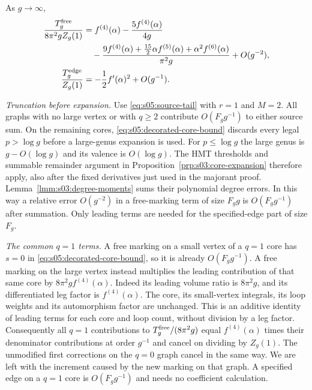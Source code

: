 \begin{lmm}\label{lmm:s05:single-source}
As $g\to\infty$,
\begin{align}
 \frac{T_g^{\rm free}}{8\pi^2gZ_g(1)}
 &=f^{(4)}(\alpha)-\frac{5f^{(4)}(\alpha)}{4g}\notag\\
 &\quad-\frac{9f^{(4)}(\alpha)
          +\tfrac{15}{2}\alpha f^{(5)}(\alpha)
          +\alpha^2 f^{(6)}(\alpha)}{\pi^2g}
          +O(g^{-2}),
 \label{eq:s05:free-ratio}\\
 \frac{T_g^{\rm edge}}{Z_g(1)}
 &=-\frac12 f'(\alpha)^2+O(g^{-1}).
 \label{eq:s05:edge-ratio}
\end{align}
\end{lmm}
\begin{prf}
\emph{Truncation before expansion.}
Use \eqref{eq:s05:source-tail} with $r=1$ and $M=2$.
All graphs with no large vertex or with $q\geq2$ contribute
$O(F_g g^{-1})$ to either source sum. On the remaining cores,
\eqref{eq:s05:decorated-core-bound} discards every legal
$p>\log g$ before a large-genus expansion is used. For
$p\leq\log g$ the large genus is $g-O(\log g)$ and its valence is
$O(\log g)$. The HMT thresholds and summable remainder argument in
Proposition~\ref{prp:s03:core-expansion} therefore apply, also after
the fixed derivatives just used in the majorant proof.
Lemma~\ref{lmm:s03:degree-moments} sums their polynomial degree
errors. In this way a relative error $O(g^{-2})$ in a free-marking
term of size $F_g g$ is $O(F_g g^{-1})$ after summation. Only leading
terms are needed for the specified-edge part of size $F_g$.

\emph{The common $q=1$ terms.}
A free marking on a small vertex of a $q=1$ core has $s=0$ in
\eqref{eq:s05:decorated-core-bound}, so it is already
$O(F_g g^{-1})$. A free marking on the large vertex instead
multiplies the leading contribution of that same core by
$8\pi^2g f^{(4)}(\alpha)$. Indeed its leading volume ratio is
$8\pi^2g$, and its differentiated leg factor is
$f^{(4)}(\alpha)$. The core, its small-vertex integrals, its
loop weights and its automorphism factor are unchanged.
This is an additive identity of leading terms for each core and
loop count, without division by a leg factor. Consequently all
$q=1$ contributions to $T_g^{\rm free}/(8\pi^2g)$ equal
$f^{(4)}(\alpha)$ times their denominator contributions at order
$g^{-1}$ and cancel on dividing by $Z_g(1)$. The unmodified
first corrections on the $q=0$ graph cancel in the same way.
We are left with the increment caused by the new marking on that
graph. A specified edge on a $q=1$ core is
$O(F_g g^{-1})$ and needs no coefficient calculation.


\end{prf}
